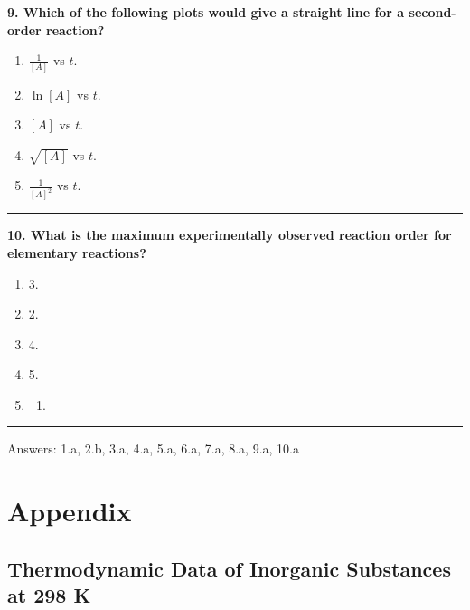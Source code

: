 \documentclass[
  9pt,
]{extbook}
\providecommand{\tightlist}{%
  \setlength{\itemsep}{0pt}\setlength{\parskip}{0pt}}
\theoremstyle{definition}
\theoremstyle{definition}
\theoremstyle{definition}
\theoremstyle{definition}
\theoremstyle{remark}
\begin{document}
\textbf{9. Which of the following plots would give a straight line for a second-order reaction?}

\begin{enumerate}
\def\labelenumi{\alph{enumi}.}
\tightlist
\item
  \(\frac{1}{[A]}\) vs \(t\).
\item
  \(\ln[A]\) vs \(t\).
\item
  \([A]\) vs \(t\).
\item
  \(\sqrt{[A]}\) vs \(t\).
\item
  \(\frac{1}{[A]^2}\) vs \(t\).
\end{enumerate}

\begin{center}\rule{0.5\linewidth}{0.5pt}\end{center}

\textbf{10. What is the maximum experimentally observed reaction order for elementary reactions?}

\begin{enumerate}
\def\labelenumi{\alph{enumi}.}
\tightlist
\item
  3.
\item
  2.
\item
  4.
\item
  5.
\item
  \begin{enumerate}
  \def\labelenumii{\arabic{enumii}.}
  \tightlist
  \item
  \end{enumerate}
\end{enumerate}

\begin{center}\rule{0.5\linewidth}{0.5pt}\end{center}

Answers: 1.a, 2.b, 3.a, 4.a, 5.a, 6.a, 7.a, 8.a, 9.a, 10.a

\renewcommand*{\standardstate}{{-\kern-6pt{\ominus}\kern-6pt-}}

\chapter{Appendix}\label{appendix}

\section{Thermodynamic Data of Inorganic Substances at 298 K}\label{thermodynamic-data-of-inorganic-substances-at-298-k}
\end{document}
